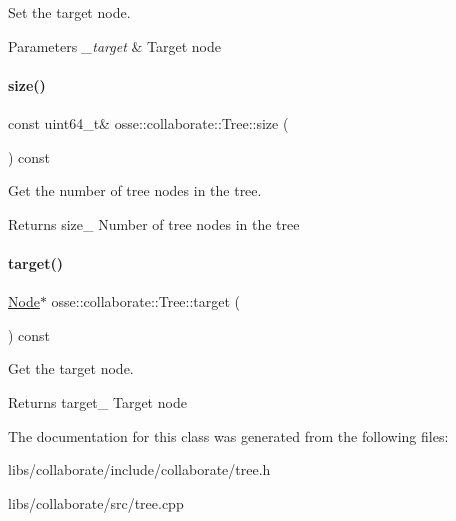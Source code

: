 Set the target node. 


\begin{DoxyParams}{Parameters}
{\em \+\_\+target} & Target node \\
\hline
\end{DoxyParams}
\mbox{\label{classosse_1_1collaborate_1_1_tree_aef931848873af9beaccf80423935c474}} 
\paragraph{\texorpdfstring{size()}{size()}}
{\footnotesize\ttfamily const uint64\+\_\+t\& osse\+::collaborate\+::\+Tree\+::size (\begin{DoxyParamCaption}{ }\end{DoxyParamCaption}) const\hspace{0.3cm}{\ttfamily [inline]}}



Get the number of tree nodes in the tree. 

\begin{DoxyReturn}{Returns}
size\+\_\+ Number of tree nodes in the tree 
\end{DoxyReturn}
\mbox{\label{classosse_1_1collaborate_1_1_tree_a59e323729df69811feb9a8b958a5d31b}} 
\paragraph{\texorpdfstring{target()}{target()}}
{\footnotesize\ttfamily \hyperlink{classosse_1_1collaborate_1_1_node}{Node}$\ast$ osse\+::collaborate\+::\+Tree\+::target (\begin{DoxyParamCaption}{ }\end{DoxyParamCaption}) const\hspace{0.3cm}{\ttfamily [inline]}}



Get the target node. 

\begin{DoxyReturn}{Returns}
target\+\_\+ Target node 
\end{DoxyReturn}


The documentation for this class was generated from the following files\+:\begin{DoxyCompactItemize}
\item 
libs/collaborate/include/collaborate/tree.\+h\item 
libs/collaborate/src/tree.\+cpp\end{DoxyCompactItemize}
